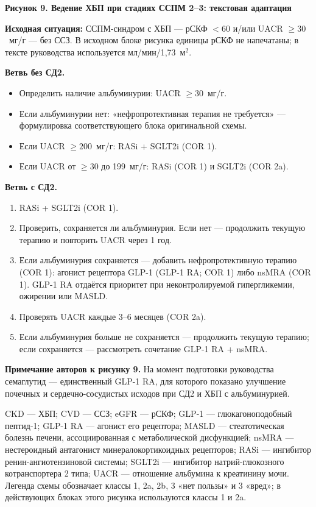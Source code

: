 \documentclass[11pt,a4paper]{article}
\newcommand{\heading}[1]{\par\medskip\textbf{#1}\par}
\newcommand{\unitgfr}{мл/мин/1,73~м$^2$}
\begin{document}
\heading{Рисунок 9. Ведение ХБП при стадиях ССПМ 2--3: текстовая адаптация}
\textbf{Исходная ситуация:} ССПМ-синдром с ХБП --- рСКФ $<60$ и/или UACR $\geq30$~мг/г --- без ССЗ. В исходном блоке рисунка единицы рСКФ не напечатаны; в тексте руководства используется \unitgfr.

\textbf{Ветвь без СД2.}
\begin{itemize}
\item Определить наличие альбуминурии: UACR $\geq30$~мг/г.
\item Если альбуминурии нет: «нефропротективная терапия не требуется» --- формулировка соответствующего блока оригинальной схемы.
\item Если UACR $\geq200$~мг/г: RASi + SGLT2i (COR 1).
\item Если UACR от $\geq30$ до 199~мг/г: RASi (COR 1) и SGLT2i (COR 2a).
\end{itemize}

\textbf{Ветвь с СД2.}
\begin{enumerate}
\item RASi + SGLT2i (COR 1).
\item Проверить, сохраняется ли альбуминурия. Если нет --- продолжить текущую терапию и повторить UACR через 1 год.
\item Если альбуминурия сохраняется --- добавить нефропротективную терапию (COR 1): агонист рецептора GLP-1 (GLP-1 RA; COR 1) либо nsMRA (COR 1). GLP-1 RA отдаётся приоритет при неконтролируемой гипергликемии, ожирении или MASLD.
\item Проверять UACR каждые 3--6 месяцев (COR 2a).
\item Если альбуминурия больше не сохраняется --- продолжить текущую терапию; если сохраняется --- рассмотреть сочетание GLP-1 RA + nsMRA.
\end{enumerate}

\textbf{Примечание авторов к рисунку 9.} На момент подготовки руководства семаглутид --- единственный GLP-1 RA, для которого показано улучшение почечных и сердечно-сосудистых исходов при СД2 и ХБП с альбуминурией.

CKD --- ХБП; CVD --- ССЗ; eGFR --- рСКФ; GLP-1 --- глюкагоноподобный пептид-1; GLP-1 RA --- агонист его рецептора; MASLD --- стеатотическая болезнь печени, ассоциированная с метаболической дисфункцией; nsMRA --- нестероидный антагонист минералокортикоидных рецепторов; RASi --- ингибитор ренин-ангиотензиновой системы; SGLT2i --- ингибитор натрий-глюкозного котранспортера 2 типа; UACR --- отношение альбумина к креатинину мочи. Легенда схемы обозначает классы 1, 2a, 2b, 3 «нет пользы» и 3 «вред»; в действующих блоках этого рисунка используются классы 1 и 2a.
\end{document}
